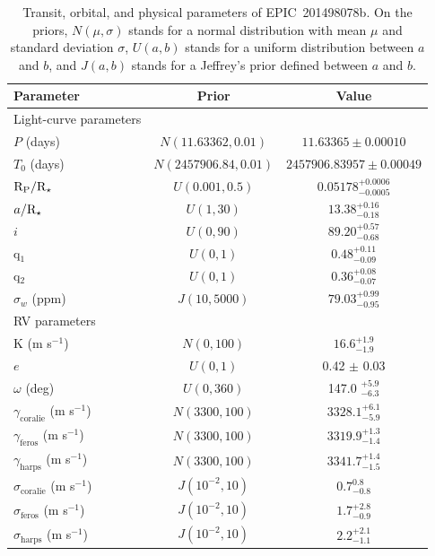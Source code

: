 \documentclass[useAMS,usenatbib]{mnras}
\newcommand{\rpl}{\ensuremath{{\rm R_P}}}
\newcommand{\rstar}{\ensuremath{{\rm R}_{\star}}}
\newcommand{\plname}{EPIC~201498078b}
\begin{document}
\begin{table}
 \centering
 \begin{center}
   \caption{Transit, orbital, and physical parameters of \plname. On the priors, $N(\mu,\sigma)$ stands for a normal distribution with mean $\mu$ and standard deviation $\sigma$, $U(a,b)$ stands for a uniform distribution between $a$ and $b$, and $J(a,b)$ stands for a Jeffrey's prior defined between $a$ and $b$.}
   \label{tab:planet}
 \begin{threeparttable}

  \begin{tabular}{@{}lcc@{}}
  \hline
   
  Parameter      &   Prior &  Value \\
 \hline
 Light-curve parameters \\
 
$P$ (days) & $N(11.63362,0.01)$ & $11.63365 \pm 0.00010$\\
$T_0$ (days) & $N(2457906.84,0.01)$ & $2457906.83957 \pm 0.00049$\\
$\rpl/\rstar$ & $U(0.001,0.5)$ & $0.05178^{+0.0006}_{-0.0005}$\\
$a/\rstar$ & $U(1,30)$ & $13.38^{+0.16}_{-0.18}$\\
$i$ & $U(0,90)$  & $89.20^{+0.57}_{-0.68}$ \\
q$_1$ & $U(0,1)$ & $0.48^{+0.11}_{-0.09}$\\
q$_2$ & $U(0,1)$ & $0.36^{+0.08}_{-0.07}$\\
$\sigma_w$ (ppm) & $J(10,5000)$ & $79.03^{+0.99}_{-0.95}$\\

\hline
RV parameters\\

K  (m s$^{-1}$)  &  $N(0,100)$ & $16.6^{+1.9}_{-1.9}$\\
$e$              &  $U(0,1)$    & 0.42 $\pm$ 0.03 \\
$\omega$ (deg)   &  $U(0,360)$  & 147.0 $^{+5.9}_{-6.3} $\\
$\gamma_\mathrm{coralie}$ (m s$^{-1}$) & $N(3300,100)$ &   $3328.1^{+6.1}_{-5.9} $ \\
$\gamma_\mathrm{feros}$ (m s$^{-1}$)   & $N(3300,100)$ &   $3319.9^{+1.3}_{-1.4} $\\
$\gamma_\mathrm{harps}$ (m s$^{-1}$)   & $N(3300,100)$ &   $3341.7^{+1.4}_{-1.5} $ \\
$\sigma_\mathrm{coralie}$ (m s$^{-1}$) & $J(10^{-2},10)$ &  $0.7^{0.8}_{-0.8} $ \\
$\sigma_\mathrm{feros}$ (m s$^{-1}$)   & $J(10^{-2},10)$ &  $1.7^{+2.8}_{-0.9} $ \\
$\sigma_\mathrm{harps}$ (m s$^{-1}$)   & $J(10^{-2},10)$ &  $2.2^{+2.1}_{-1.1} $ \\


\end{tabular}
\end{threeparttable}
\end{center}
\end{table}
\end{document}
